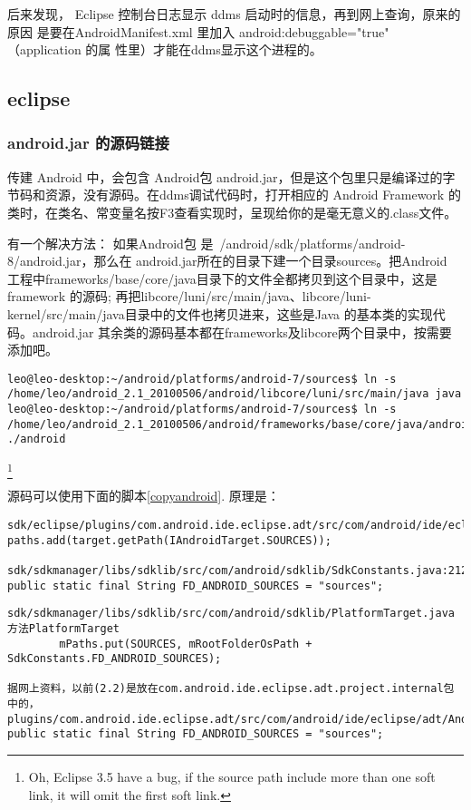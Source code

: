 \documentclass[a4paper,titlepage]{article}
\begin{document}
后来发现， Eclipse 控制台日志显示 ddms 启动时的信息，再到网上查询，原来的原因
是要在AndroidManifest.xml 里加入 android:debuggable="true" （application 的属
性里）才能在ddms显示这个进程的。
\subsection{eclipse}
\subsubsection{android.jar 的源码链接}
传建 Android 中，会包含 Android包 android.jar，但是这个包里只是编译过的字节码和资源，没有源码。在ddms调试代码时，打开相应的 Android Framework 的类时，在类名、常变量名按F3查看实现时，呈现给你的是毫无意义的.class文件。

有一个解决方法：
如果Android包 是~/android/sdk/platforms/android-8/android.jar，那么在 android.jar所在的目录下建一个目录sources。把Android 工程中frameworks/base/core/java目录下的文件全都拷贝到这个目录中，这是framework 的源码; 再把libcore/luni/src/main/java、libcore/luni-kernel/src/main/java目录中的文件也拷贝进来，这些是Java 的基本类的实现代码。android.jar 其余类的源码基本都在frameworks及libcore两个目录中，按需要添加吧。


\begin{lstlisting}
leo@leo-desktop:~/android/platforms/android-7/sources$ ln -s /home/leo/android_2.1_20100506/android/libcore/luni/src/main/java java
leo@leo-desktop:~/android/platforms/android-7/sources$ ln -s /home/leo/android_2.1_20100506/android/frameworks/base/core/java/android ./android
\end{lstlisting}
\footnote{Oh, Eclipse 3.5 have a bug, if the source path include more than one
soft link, it will omit the first soft link.}

源码可以使用下面的脚本\ref{copyandroid}.
原理是：
\begin{lstlisting}
sdk/eclipse/plugins/com.android.ide.eclipse.adt/src/com/android/ide/eclipse/adt/internal/project/AndroidClasspathContainerInitializer.java:636:        paths.add(target.getPath(IAndroidTarget.SOURCES)); 

sdk/sdkmanager/libs/sdklib/src/com/android/sdklib/SdkConstants.java:212:    public static final String FD_ANDROID_SOURCES = "sources"; 
\end{lstlisting}

\begin{verbatim}
sdk/sdkmanager/libs/sdklib/src/com/android/sdklib/PlatformTarget.java
方法PlatformTarget
        mPaths.put(SOURCES, mRootFolderOsPath + SdkConstants.FD_ANDROID_SOURCES);

据网上资料，以前(2.2)是放在com.android.ide.eclipse.adt.project.internal包中的，
plugins/com.android.ide.eclipse.adt/src/com/android/ide/eclipse/adt/AndroidConstants.java:
public static final String FD_ANDROID_SOURCES = "sources";
\end{verbatim}
\end{document}
